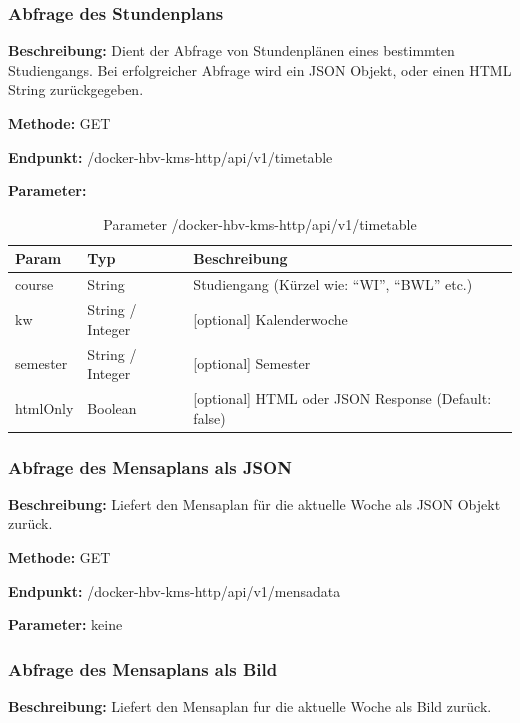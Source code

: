 \subsubsection{Abfrage des Stundenplans}
\label{sec:api-timetable}
\textbf{Beschreibung:} Dient der Abfrage von Stundenplänen eines bestimmten Studiengangs. Bei erfolgreicher Abfrage wird ein JSON Objekt, oder einen HTML String zurückgegeben.

\textbf{Methode:} GET

\textbf{Endpunkt:} /docker-hbv-kms-http/api/v1/timetable

\textbf{Parameter:}
\begin{table}[H]
    \label{table:/docker-hbv-kms-http/api/v1/timetable}
    \caption{Parameter /docker-hbv-kms-http/api/v1/timetable}
    \setlength{\tabcolsep}{3pt}
    \begin{tabular}{p{100pt}p{80pt}p{200pt}}
        \toprule
        Param    & Typ              & Beschreibung                                        \\
        \midrule
        course   & String           & Studiengang (Kürzel wie: ``WI'', ``BWL'' etc.)      \\
        kw       & String / Integer & [optional] Kalenderwoche                            \\
        semester & String / Integer & [optional] Semester                                 \\
        htmlOnly & Boolean          & [optional] HTML oder JSON Response (Default: false) \\
        \bottomrule
    \end{tabular}
\end{table}
\dotfill


\subsubsection{Abfrage des Mensaplans als JSON}
\label{sec:api-mensa-json}
\textbf{Beschreibung:} Liefert den Mensaplan für die aktuelle Woche als JSON Objekt zurück.

\textbf{Methode:} GET

\textbf{Endpunkt:} /docker-hbv-kms-http/api/v1/mensadata

\textbf{Parameter:} keine

\dotfill

\subsubsection{Abfrage des Mensaplans als Bild}
\label{sec:api-mensa-img}
\textbf{Beschreibung:} Liefert den Mensaplan fur die aktuelle Woche als Bild zurück.

